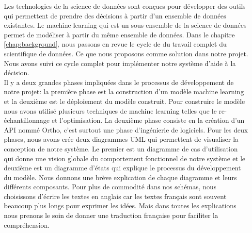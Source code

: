 \documentclass[12pt, french]{report}
\begin{document}
Les technologies de la science de données sont conçues pour développer des outils qui permettent de prendre des décisions à partir d'un ensemble de données existantes. Le machine learning qui est un sous-ensemble de la science de données permet de modéliser à partir du même ensemble de données. Dans le chapitre \ref{chap:background}, nous passons en revue le cycle de du travail complet du scientifique de données. Ce que nous proposons comme solution dans notre projet. Nous avons suivi ce cycle complet pour implémenter notre système d'aide à la décision. \\

Il y a deux grandes phases impliquées dans le processus de développement de notre projet: la première phase est la construction d'un modèle machine learning et la deuxième est le déploiement du modèle construit. Pour construire le modèle nous avons utilisé plusieurs techniques de machine learning telles que le re-échantillonnage et l'optimisation.  La deuxième phase consiste en la création d'un API nommé Ortho, c'est surtout une phase d'ingénierie de logiciels. Pour les deux phases, nous avons crée deux diagrammes UML qui permettent de visualiser la conception de notre système. Le premier est un diagramme de cas d'utilisation qui donne une vision globale du comportement fonctionnel de notre système et le deuxième est un diagramme d'états qui explique le processus du développement du modèle. Nous donnons une brève explication de chaque diagramme et leurs différents composants. Pour plus de commodité dans nos schémas, nous choisissons d'écrire les textes en anglais car les textes français sont souvent beaucoup plus longs pour exprimer les idées. Mais dans toutes les explications nous prenons le soin de donner une traduction française pour faciliter la compréhension.\\
\end{document}
